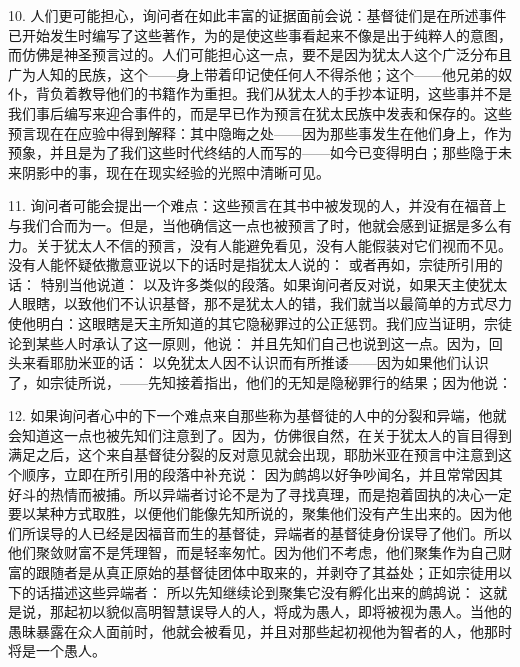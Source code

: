 10. 人们更可能担心，询问者在如此丰富的证据面前会说：基督徒们是在所述事件已开始发生时编写了这些著作，为的是使这些事看起来不像是出于纯粹人的意图，而仿佛是神圣预言过的。人们可能担心这一点，要不是因为犹太人这个广泛分布且广为人知的民族，这个——身上带着印记使任何人不得杀他；这个——他兄弟的奴仆，背负着教导他们的书籍作为重担。我们从犹太人的手抄本证明，这些事并不是我们事后编写来迎合事件的，而是早已作为预言在犹太民族中发表和保存的。这些预言现在在应验中得到解释：其中隐晦之处——因为那些事发生在他们身上，作为预象，并且是为了我们这些时代终结的人而写的——如今已变得明白；那些隐于未来阴影中的事，现在在现实经验的光照中清晰可见。\par

11. 询问者可能会提出一个难点：这些预言在其书中被发现的人，并没有在福音上与我们合而为一。但是，当他确信这一点也被预言了时，他就会感到证据是多么有力。关于犹太人不信的预言，没有人能避免看见，没有人能假装对它们视而不见。没有人能怀疑依撒意亚说以下的话时是指犹太人说的： 或者再如，宗徒所引用的话： 特别当他说道： 以及许多类似的段落。如果询问者反对说，如果天主使犹太人眼瞎，以致他们不认识基督，那不是犹太人的错，我们就当以最简单的方式尽力使他明白：这眼瞎是天主所知道的其它隐秘罪过的公正惩罚。我们应当证明，宗徒论到某些人时承认了这一原则，他说： 并且先知们自己也说到这一点。因为，回头来看耶肋米亚的话： 以免犹太人因不认识而有所推诿——因为如果他们认识了，如宗徒所说，——先知接着指出，他们的无知是隐秘罪行的结果；因为他说：\par

12. 如果询问者心中的下一个难点来自那些称为基督徒的人中的分裂和异端，他就会知道这一点也被先知们注意到了。因为，仿佛很自然，在关于犹太人的盲目得到满足之后，这个来自基督徒分裂的反对意见就会出现，耶肋米亚在预言中注意到这个顺序，立即在所引用的段落中补充说： 因为鹧鸪以好争吵闻名，并且常常因其好斗的热情而被捕。所以异端者讨论不是为了寻找真理，而是抱着固执的决心一定要以某种方式取胜，以便他们能像先知所说的，聚集他们没有产生出来的。因为他们所误导的人已经是因福音而生的基督徒，异端者的基督徒身份误导了他们。所以他们聚敛财富不是凭理智，而是轻率匆忙。因为他们不考虑，他们聚集作为自己财富的跟随者是从真正原始的基督徒团体中取来的，并剥夺了其益处；正如宗徒用以下的话描述这些异端者： 所以先知继续论到聚集它没有孵化出来的鹧鸪说： 这就是说，那起初以貌似高明智慧误导人的人，将成为愚人，即将被视为愚人。当他的愚昧暴露在众人面前时，他就会被看见，并且对那些起初视他为智者的人，他那时将是一个愚人。\par

